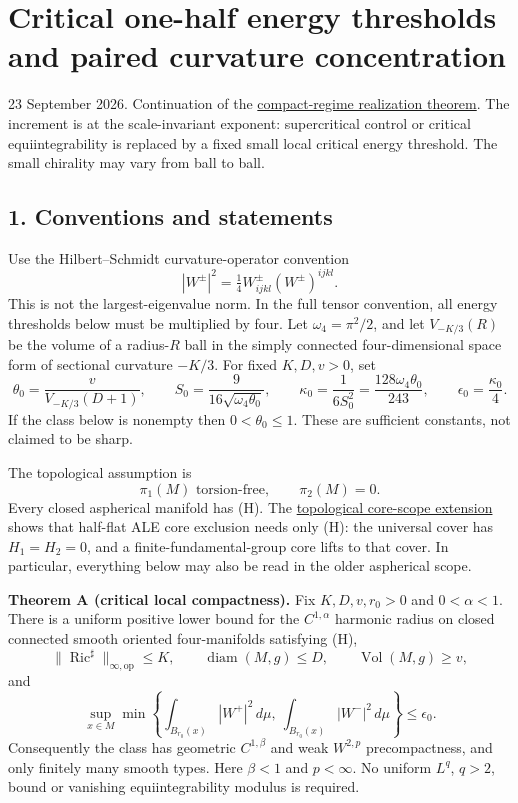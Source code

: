 \documentclass[
  11pt,
]{article}
\author{}
\date{}
\begin{document}
\hypertarget{critical-one-half-energy-thresholds-and-paired-curvature-concentration}{%
\section{Critical one-half energy thresholds and paired curvature
concentration}\label{critical-one-half-energy-thresholds-and-paired-curvature-concentration}}

23 September 2026. Continuation of the
\href{20260923_compact_realization.md}{compact-regime realization
theorem}. The increment is at the scale-invariant exponent:
supercritical control or critical equiintegrability is replaced by a
fixed small local critical energy threshold. The small chirality may
vary from ball to ball.

\hypertarget{conventions-and-statements}{%
\subsection{1. Conventions and
statements}\label{conventions-and-statements}}

Use the Hilbert--Schmidt curvature-operator convention \[
 |W^\pm|^2=\tfrac14 W^\pm_{ijkl}(W^\pm)^{ijkl}.             \tag{1}
\] This is not the largest-eigenvalue norm. In the full tensor
convention, all energy thresholds below must be multiplied by four. Let
\(\omega_4=\pi^2/2\), and let \(V_{-K/3}(R)\) be the volume of a
radius-\(R\) ball in the simply connected four-dimensional space form of
sectional curvature \(-K/3\). For fixed \(K,D,v>0\), set \[
 \theta_0=\frac{v}{V_{-K/3}(D+1)},\qquad
 S_0=\frac9{16\sqrt{\omega_4\theta_0}},\qquad
 \kappa_0=\frac1{6S_0^2}=\frac{128\omega_4\theta_0}{243},
 \qquad \epsilon_0=\frac{\kappa_0}{4}.                    \tag{2}
\] If the class below is nonempty then \(0<\theta_0\le1\). These are
sufficient constants, not claimed to be sharp.

The topological assumption is \[
 \pi_1(M)\text{ torsion-free},\qquad \pi_2(M)=0.            \tag{H}
\] Every closed aspherical manifold has (H). The
\href{20260923_topological_core_scope.md}{topological core-scope
extension} shows that half-flat ALE core exclusion needs only (H): the
universal cover has \(H_1=H_2=0\), and a finite-fundamental-group core
lifts to that cover. In particular, everything below may also be read in
the older aspherical scope.

\textbf{Theorem A (critical local compactness).} Fix \(K,D,v,r_0>0\) and
\(0<\alpha<1\). There is a uniform positive lower bound for the
\(C^{1,\alpha}\) harmonic radius on closed connected smooth oriented
four-manifolds satisfying (H), \[
 \|\operatorname{Ric}^{\sharp}\|_{\infty,\mathrm{op}}\le K,
 \qquad \operatorname{diam}(M,g)\le D,\qquad
 \operatorname{Vol}(M,g)\ge v,                            \tag{3}
\] and \[
 \sup_{x\in M}\min\left\{
   \int_{B_{r_0}(x)}|W^+|^2\,d\mu,\
   \int_{B_{r_0}(x)}|W^-|^2\,d\mu
                   \right\}\le\epsilon_0.               \tag{4}
\] Consequently the class has geometric \(C^{1,\beta}\) and weak
\(W^{2,p}\) precompactness, and only finitely many smooth types. Here
\(\beta<1\) and \(p<\infty\). No uniform \(L^q\), \(q>2\), bound or
vanishing equiintegrability modulus is required.
\end{document}
